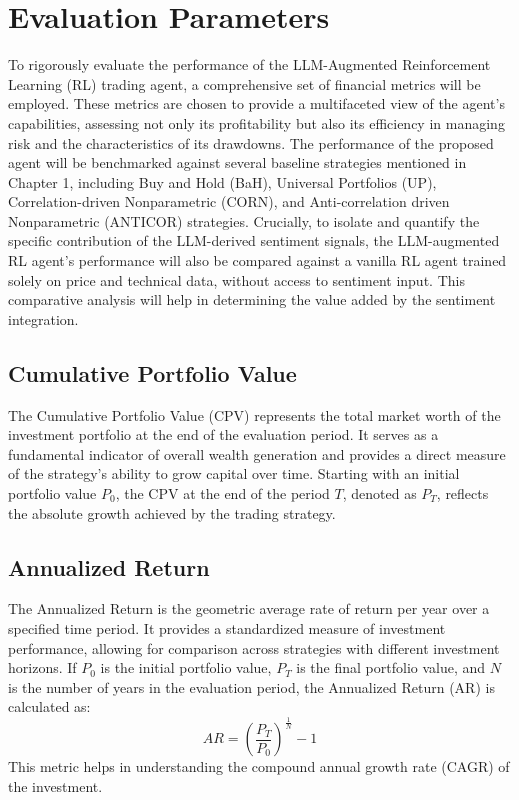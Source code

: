 \section{Evaluation Parameters}
To rigorously evaluate the performance of the LLM-Augmented Reinforcement Learning (RL) trading agent, a comprehensive set of financial metrics will be employed. These metrics are chosen to provide a multifaceted view of the agent's capabilities, assessing not only its profitability but also its efficiency in managing risk and the characteristics of its drawdowns. The performance of the proposed agent will be benchmarked against several baseline strategies mentioned in Chapter 1, including Buy and Hold (BaH), Universal Portfolios (UP), Correlation-driven Nonparametric (CORN), and Anti-correlation driven Nonparametric (ANTICOR) strategies. Crucially, to isolate and quantify the specific contribution of the LLM-derived sentiment signals, the LLM-augmented RL agent's performance will also be compared against a vanilla RL agent trained solely on price and technical data, without access to sentiment input. This comparative analysis will help in determining the value added by the sentiment integration.

\subsection{Cumulative Portfolio Value}
The Cumulative Portfolio Value (CPV) represents the total market worth of the investment portfolio at the end of the evaluation period. It serves as a fundamental indicator of overall wealth generation and provides a direct measure of the strategy's ability to grow capital over time. Starting with an initial portfolio value \(P_0\), the CPV at the end of the period \(T\), denoted as \(P_T\), reflects the absolute growth achieved by the trading strategy.

\subsection{Annualized Return}
The Annualized Return is the geometric average rate of return per year over a specified time period. It provides a standardized measure of investment performance, allowing for comparison across strategies with different investment horizons. If \(P_0\) is the initial portfolio value, \(P_T\) is the final portfolio value, and \(N\) is the number of years in the evaluation period, the Annualized Return (AR) is calculated as:
\[ AR = \left( \frac{P_T}{P_0} \right)^{\frac{1}{N}} - 1 \]
This metric helps in understanding the compound annual growth rate (CAGR) of the investment.

